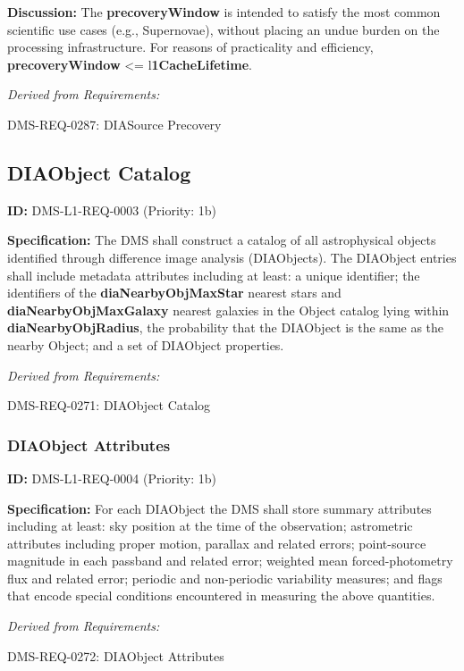 \documentclass[SE,toc,lsstdraft]{lsstdoc}
\begin{document}
\textbf{Discussion: }The \textbf{precoveryWindow }is intended to satisfy the most common scientific use cases (e.g., Supernovae), without placing an undue burden on the processing infrastructure.  For reasons of practicality and efficiency, \textbf{precoveryWindow }<= l\textbf{1CacheLifetime}.

\emph{Derived from Requirements:}

DMS-REQ-0287:
DIASource Precovery \newline

\subsection{DIAObject Catalog}

\label{DMS-L1-REQ-0003}
\textbf{ID:} DMS-L1-REQ-0003 (Priority: 1b)

\textbf{Specification:} The DMS shall construct a catalog of all astrophysical objects identified through difference image analysis (DIAObjects). The DIAObject entries shall include metadata attributes including at least: a unique identifier; the identifiers of the\textbf{ diaNearbyObjMaxStar} nearest stars and \textbf{diaNearbyObjMaxGalaxy} nearest galaxies in the Object catalog lying within \textbf{diaNearbyObjRadius}, the probability that the DIAObject is the same as the nearby Object; and a set of DIAObject properties.

\emph{Derived from Requirements:}

DMS-REQ-0271:
DIAObject Catalog \newline

\subsubsection{DIAObject Attributes}

\label{DMS-L1-REQ-0004}
\textbf{ID:} DMS-L1-REQ-0004 (Priority: 1b)

\textbf{Specification:} For each DIAObject the DMS shall store summary attributes including at least: sky position at the time of the observation; astrometric attributes including proper motion, parallax and related errors; point-source magnitude in each passband and related error; weighted mean forced-photometry flux and related error; periodic and non-periodic variability measures; and flags that encode special conditions encountered in measuring the above quantities.

\emph{Derived from Requirements:}

DMS-REQ-0272:
DIAObject Attributes \newline
\end{document}
